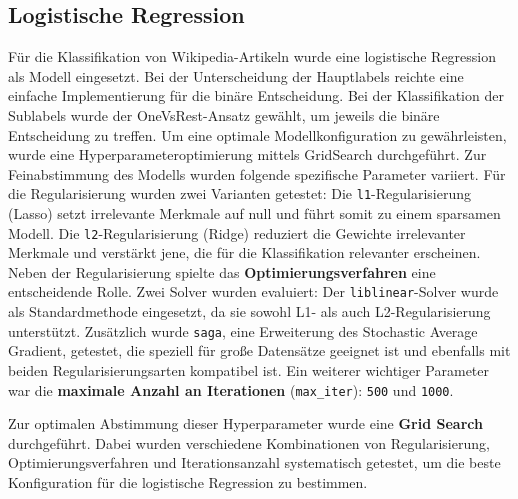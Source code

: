 \subsection{Logistische Regression}

Für die Klassifikation von Wikipedia-Artikeln wurde eine logistische Regression als Modell eingesetzt. Bei der Unterscheidung der Hauptlabels reichte eine einfache Implementierung für die binäre Entscheidung. Bei der Klassifikation der Sublabels wurde der OneVsRest-Ansatz gewählt, um jeweils die binäre Entscheidung zu treffen. Um eine optimale Modellkonfiguration zu gewährleisten, wurde eine Hyperparameteroptimierung mittels GridSearch durchgeführt. Zur Feinabstimmung des Modells wurden folgende spezifische Parameter variiert. Für die Regularisierung wurden zwei Varianten getestet: Die \texttt{l1}-Regularisierung (Lasso) setzt irrelevante Merkmale auf null und führt somit zu einem sparsamen Modell. Die \texttt{l2}-Regularisierung (Ridge) reduziert die Gewichte irrelevanter Merkmale und verstärkt jene, die für die Klassifikation relevanter erscheinen. Neben der Regularisierung spielte das \textbf{Optimierungsverfahren} eine entscheidende Rolle. Zwei Solver wurden evaluiert: Der \texttt{liblinear}-Solver wurde als Standardmethode eingesetzt, da sie sowohl L1- als auch L2-Regularisierung unterstützt. Zusätzlich wurde \texttt{saga}, eine Erweiterung des Stochastic Average Gradient, getestet, die speziell für große Datensätze geeignet ist und ebenfalls mit beiden Regularisierungsarten kompatibel ist.
Ein weiterer wichtiger Parameter war die \textbf{maximale Anzahl an Iterationen} (\texttt{max\_iter}): \texttt{500} und \texttt{1000}.

Zur optimalen Abstimmung dieser Hyperparameter wurde eine \textbf{Grid Search} durchgeführt. Dabei wurden verschiedene Kombinationen von Regularisierung, Optimierungsverfahren und Iterationsanzahl systematisch getestet, um die beste Konfiguration für die logistische Regression zu bestimmen.




